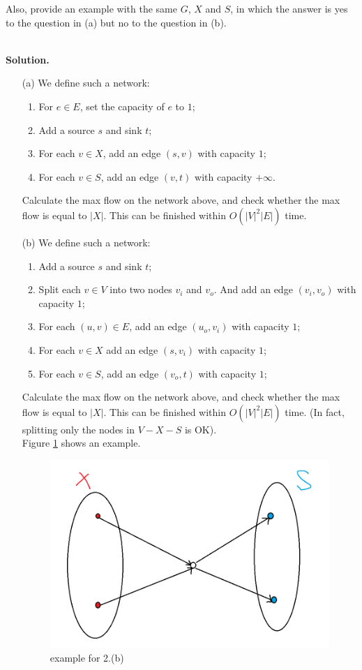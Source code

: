 \documentclass{article}
\begin{document}
\begin{enumerate}
\begin{enumerate}
    Also, provide an example with the same $G$, $X$ and $S$, in which the answer is yes to the question in (a) but no to the question in (b).
\end{enumerate}
~\\
\textbf{Solution.}\\
\begin{enumerate}
\item [(a)] We define such a network: \begin{enumerate}
    \item For $e\in E$, set the capacity of $e$ to $1$;
    \item Add a source $s$ and sink $t$;
    \item For each $v\in X$, add an edge $(s, v)$ with capacity $1$;
    \item For each $v\in S$, add an edge $(v, t)$ with capacity $+\infty$.
\end{enumerate}
Calculate the max flow on the network above, and check whether the max flow is equal to $|X|$. This can be finished within $O(|V|^2|E|)$ time. 
\item [(b)] We define such a network: \begin{enumerate}
    \item Add a source $s$ and sink $t$;
    \item Split each $v\in V$ into two nodes $v_i$ and $v_o$. And add an edge $(v_i, v_o)$ with capacity $1$;
    \item For each $(u,v)\in E$, add an edge $(u_o, v_i)$ with capacity $1$;
    \item For each $v\in X$ add an edge $(s, v_i)$ with capacity $1$;
    \item For each $v\in S$, add an edge $(v_o, t)$ with capacity $1$;
\end{enumerate}
Calculate the max flow on the network above, and check whether the max flow is equal to $|X|$. This can be finished within $O(|V|^2|E|)$ time. (In fact, splitting only the nodes in $V-X-S$ is OK).\\ Figure \ref{fig5} shows an example. 
\begin{figure}[htb]\centering\includegraphics[width=0.5\linewidth]{fig5.png}\caption{example for 2.(b)}\label{fig5}\end{figure}
\end{enumerate}
~\\


\end{enumerate}
\end{document}
